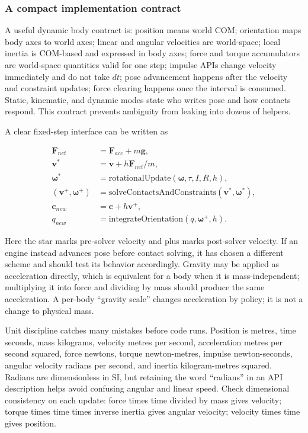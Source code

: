 \subsubsection{A compact implementation contract}\label{a-compact-implementation-contract}

A useful dynamic body contract is: position means world COM; orientation maps body axes to world axes; linear and angular velocities are world-space; local inertia is COM-based and expressed in body axes; force and torque accumulators are world-space quantities valid for one step; impulse APIs change velocity immediately and do not take \(dt\); pose advancement happens after the velocity and constraint updates; force clearing happens once the interval is consumed. Static, kinematic, and dynamic modes state who writes pose and how contacts respond. This contract prevents ambiguity from leaking into dozens of helpers.

A clear fixed-step interface can be written as

\[
\begin{aligned}
\mathbf F_{net}&=\mathbf F_{acc}+m\mathbf g,\\
\mathbf v^*&=\mathbf v+h\mathbf F_{net}/m,\\
\boldsymbol\omega^*&=\text{rotationalUpdate}(\boldsymbol\omega,\tau,I,R,h),\\
(\mathbf v^+,\boldsymbol\omega^+)&=\text{solveContactsAndConstraints}(\mathbf v^*,\boldsymbol\omega^*),\\
\mathbf c_{new}&=\mathbf c+h\mathbf v^+,\\
q_{new}&=\text{integrateOrientation}(q,\boldsymbol\omega^+,h).
\end{aligned}
\]

Here the star marks pre-solver velocity and plus marks post-solver velocity. If an engine instead advances pose before contact solving, it has chosen a different scheme and should test its behavior accordingly. Gravity may be applied as acceleration directly, which is equivalent for a body when it is mass-independent; multiplying it into force and dividing by mass should produce the same acceleration. A per-body ``gravity scale'' changes acceleration by policy; it is not a change to physical mass.

Unit discipline catches many mistakes before code runs. Position is metres, time seconds, mass kilograms, velocity metres per second, acceleration metres per second squared, force newtons, torque newton-metres, impulse newton-seconds, angular velocity radians per second, and inertia kilogram-metres squared. Radians are dimensionless in SI, but retaining the word ``radians'' in an API description helps avoid confusing angular and linear speed. Check dimensional consistency on each update: force times time divided by mass gives velocity; torque times time times inverse inertia gives angular velocity; velocity times time gives position.

